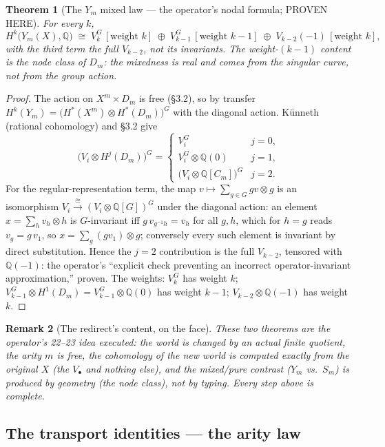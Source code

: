 \documentclass[11pt]{article}
\newtheorem{theorem}{Theorem}
\newtheorem{remark}[theorem]{Remark}
\newcommand{\Q}{\mathbb Q}
\begin{document}
\begin{theorem}[The $Y_m$ mixed law --- the operator's nodal formula;
PROVEN HERE]
For every $k$,
\[
H^k\big(Y_m(X),\Q\big)\;\cong\;
V_k^{G}\,[\text{weight }k]\;\oplus\;
V_{k-1}^{G}\,[\text{weight }k-1]\;\oplus\;
V_{k-2}(-1)\,[\text{weight }k],
\]
with the third term the \emph{full} $V_{k-2}$, not its invariants. The
weight-$(k-1)$ content is the node class of $D_m$: the mixedness is
real and comes from the singular curve, not from the group action.
\end{theorem}

\begin{proof}
The action on $X^m\times D_m$ is free (\S3.2), so by transfer
$H^k(Y_m)=\big(H^*(X^m)\otimes H^*(D_m)\big)^G$ with the diagonal
action. K\"unneth (rational cohomology) and \S3.2 give
\[
\big(V_i\otimes H^j(D_m)\big)^G
=\begin{cases}
V_i^G & j=0,\\
V_{i}^G\otimes\Q(0) & j=1,\\
\big(V_i\otimes\Q[C_m]\big)^G & j=2.
\end{cases}
\]
For the regular-representation term, the map
$v\mapsto\sum_{g\in G}gv\otimes g$ is an isomorphism
$V_i\xrightarrow{\ \cong\ }(V_i\otimes\Q[G])^G$ under the diagonal
action: an element $x=\sum_h v_h\otimes h$ is $G$-invariant iff
$g\,v_{g^{-1}h}=v_h$ for all $g,h$, which for $h=g$ reads
$v_g=g\,v_1$, so $x=\sum_g(gv_1)\otimes g$; conversely every such
element is invariant by direct substitution. Hence the $j=2$
contribution is the full $V_{k-2}$, tensored with $\Q(-1)$:
the operator's ``explicit check preventing an incorrect
operator-invariant approximation,'' proven. The weights: $V_k^G$ has
weight $k$; $V_{k-1}^G\otimes H^1(D_m)=V_{k-1}^G\otimes\Q(0)$ has
weight $k-1$; $V_{k-2}\otimes\Q(-1)$ has weight $k$.
\end{proof}

\begin{remark}[The redirect's content, on the face]
These two theorems are the operator's 22--23 idea executed: the world
is changed by an actual finite quotient, the arity $m$ is free, the
cohomology of the new world is computed exactly from the original $X$
(the $V_\bullet$ and nothing else), and the mixed/pure contrast
($Y_m$ vs.\ $S_m$) is produced by geometry (the node class), not by
typing. Every step above is complete.
\end{remark}

\subsection{The transport identities --- the arity law}
\end{document}
